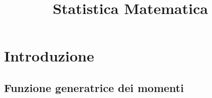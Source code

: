 \documentclass[12pt]{article}
\title{Statistica Matematica}
\author{}
\date{}
\begin{document}
\maketitle


\section{Introduzione}
\subsection{Funzione generatrice dei momenti}
\end{document}
